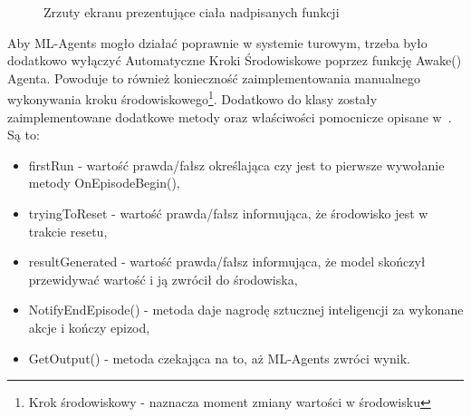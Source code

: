 \documentclass{SGGW-thesis}
\begin{document}
\begin{figure}[H]
  \ContinuedFloat
  \centering
  \hfill
  \addtocounter{figure}{1}
  \caption{Zrzuty ekranu prezentujące ciała nadpisanych funkcji}
\end{figure}
Aby ML-Agents mogło działać poprawnie w systemie turowym, trzeba było dodatkowo wyłączyć Automatyczne Kroki Środowiskowe poprzez funkcję Awake() Agenta.
Powoduje to również konieczność zaimplementowania manualnego wykonywania kroku środowiskowego\footnote{Krok środowiskowy - naznacza moment zmiany wartości w środowisku}.
Dodatkowo do klasy zostały zaimplementowane dodatkowe metody oraz właściwości pomocnicze opisane w~\cite{MLAgentsStartegyGuide}. Są to:
\begin{itemize}
  \item{firstRun - wartość prawda/fałsz określająca czy jest to pierwsze wywołanie metody OnEpisodeBegin()},
  \item{tryingToReset - wartość prawda/fałsz informująca, że środowisko jest w trakcie resetu},
  \item{resultGenerated - wartość prawda/fałsz informująca, że model skończył przewidywać wartość i ją zwrócił do środowiska},
  \item{NotifyEndEpisode() - metoda daje nagrodę sztucznej inteligencji za wykonane akcje i kończy epizod},
  \item{GetOutput() - metoda czekająca na to, aż ML-Agents zwróci wynik}.
\end{itemize}
\end{document}
